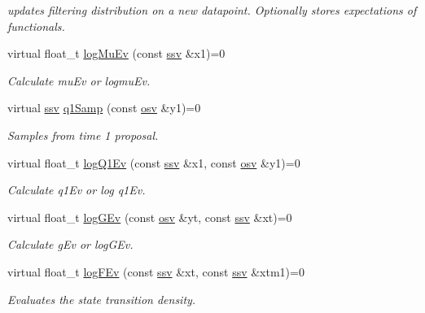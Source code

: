 \begin{DoxyCompactItemize}
\begin{DoxyCompactList}\small\item\em updates filtering distribution on a new datapoint. Optionally stores expectations of functionals. \end{DoxyCompactList}\item 
virtual float\+\_\+t \hyperlink{classSISRFilter_aff620e2208b6b26bbe109ce05520c5f8}{log\+Mu\+Ev} (const \hyperlink{classSISRFilter_abfec45cf57ea6fadae4a9da8b0042351}{ssv} \&x1)=0
\begin{DoxyCompactList}\small\item\em Calculate mu\+Ev or logmu\+Ev. \end{DoxyCompactList}\item 
virtual \hyperlink{classSISRFilter_abfec45cf57ea6fadae4a9da8b0042351}{ssv} \hyperlink{classSISRFilter_aac34adbf022dad8b62470de35c5ceb17}{q1\+Samp} (const \hyperlink{classSISRFilter_a5b762e9352857a9e48db3932191887ef}{osv} \&y1)=0
\begin{DoxyCompactList}\small\item\em Samples from time 1 proposal. \end{DoxyCompactList}\item 
virtual float\+\_\+t \hyperlink{classSISRFilter_a21d5130f35d1d5c21b697ca7ea8e9d83}{log\+Q1\+Ev} (const \hyperlink{classSISRFilter_abfec45cf57ea6fadae4a9da8b0042351}{ssv} \&x1, const \hyperlink{classSISRFilter_a5b762e9352857a9e48db3932191887ef}{osv} \&y1)=0
\begin{DoxyCompactList}\small\item\em Calculate q1\+Ev or log q1\+Ev. \end{DoxyCompactList}\item 
virtual float\+\_\+t \hyperlink{classSISRFilter_a73fe8481e4cb40142544c04823851aa8}{log\+G\+Ev} (const \hyperlink{classSISRFilter_a5b762e9352857a9e48db3932191887ef}{osv} \&yt, const \hyperlink{classSISRFilter_abfec45cf57ea6fadae4a9da8b0042351}{ssv} \&xt)=0
\begin{DoxyCompactList}\small\item\em Calculate g\+Ev or log\+G\+Ev. \end{DoxyCompactList}\item 
virtual float\+\_\+t \hyperlink{classSISRFilter_a7aa1e90a0b641728d5f8d7bd8c699ba8}{log\+F\+Ev} (const \hyperlink{classSISRFilter_abfec45cf57ea6fadae4a9da8b0042351}{ssv} \&xt, const \hyperlink{classSISRFilter_abfec45cf57ea6fadae4a9da8b0042351}{ssv} \&xtm1)=0
\begin{DoxyCompactList}\small\item\em Evaluates the state transition density. \end{DoxyCompactList}\item 

\end{DoxyCompactItemize}
